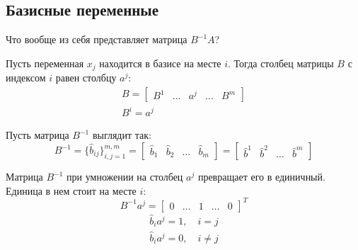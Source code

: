 \documentclass[a4paper,article,14pt]{extarticle}
\begin{document}
\subsection{Базисные переменные}

Что вообще из себя представляет матрица \(B^{-1}A\)?

Пусть переменная \(x_j\) находится в базисе на месте \(i\).
Тогда столбец матрицы \(B\) с индексом \(i\) равен столбцу \(a^j\):
\begin{equation}
    \begin{gathered}
        B = \begin{bmatrix}
            B^1 & \ldots & a^j & \ldots & B^m
        \end{bmatrix} \\
        B^i = a^j
    \end{gathered}
\end{equation}

Пусть матрица \(B^{-1}\) выглядит так:
\begin{equation}
    B^{-1} =
    \{\hat b_{ij}\}_{i,j=1}^{m,m}
    =
    \begin{bmatrix}
        \hat b_1 &
        \hat b_2 &
        \ldots &
        \hat b_m
    \end{bmatrix}
    =
    \begin{bmatrix}
        \hat b^1 &
        \hat b^2 &
        \ldots &
        \hat b^m
    \end{bmatrix}
\end{equation}

Матрица \(B^{-1}\) при умножении на столбец \(a^j\) превращает его в единичный.
Единица в нем стоит на месте \(i\):
\begin{equation}
    B^{-1}a^j = \begin{bmatrix}
        0 & \ldots & 1 & \ldots & 0
    \end{bmatrix} ^T
\end{equation}
\begin{equation}
    \begin{gathered}
        \hat b_i a^j = 1, \quad i = j \\
        \hat b_i a^j = 0, \quad i \ne j
    \end{gathered}
\end{equation}
\end{document}
